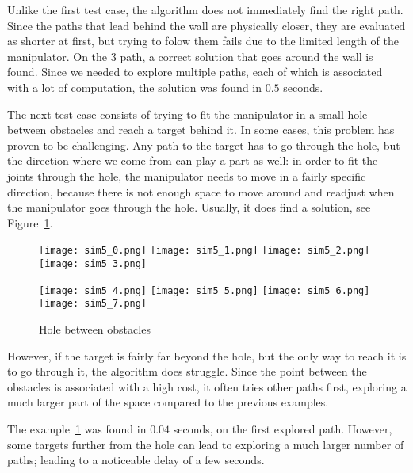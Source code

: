 Unlike the first test case, the algorithm does not immediately find the right path. Since the paths that lead behind the wall are physically closer, they are evaluated as shorter at first, but trying to folow them fails due to the limited length of the manipulator. On the 3\rd{} path, a correct solution that goes around the wall is found. Since we needed to explore multiple paths, each of which is associated with a lot of computation, the solution was found in $0.5$ seconds.

The next test case consists of trying to fit the manipulator in a small hole between obstacles and reach a target behind it. In some cases, this problem has proven to be challenging.
Any path to the target has to go through the hole, but the direction where we come from can play a part as well: in order to fit the joints through the hole, the manipulator needs to move in a fairly specific direction, because there is not enough space to move around and readjust when the manipulator goes through the hole. Usually, it does find a solution, see Figure~\ref{fig:sim5}.


\begin{figure}[ht]
  \centering
  \begin{minipage}{\textwidth}
    \texttt{[image: sim5\_0.png]}
    \texttt{[image: sim5\_1.png]}
    \texttt{[image: sim5\_2.png]}
    \texttt{[image: sim5\_3.png]}

    \texttt{[image: sim5\_4.png]}
    \texttt{[image: sim5\_5.png]}
    \texttt{[image: sim5\_6.png]}
    \texttt{[image: sim5\_7.png]}
  \end{minipage}
  \caption{Hole between obstacles}\label{fig:sim5}
\end{figure}

However, if the target is fairly far beyond the hole, but the only way to reach it is to go through it, the algorithm does struggle. Since the point between the obstacles is associated with a high cost, it often tries other paths first, exploring a much larger part of the space compared to the previous examples.

The example~\ref{fig:sim5} was found in $0.04$ seconds, on the first explored path. However, some targets further from the hole can lead to exploring a much larger number of paths; leading to a noticeable delay of a few seconds.

